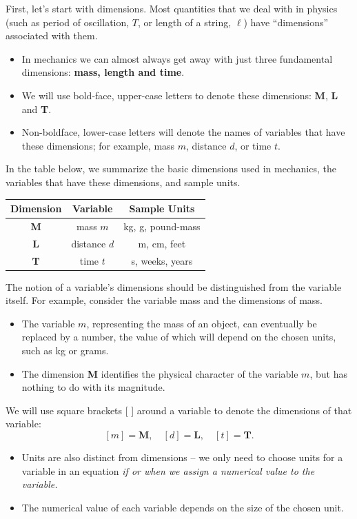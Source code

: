 \documentclass[11pt, letterpaper, openany]{book}
\begin{document}
First, let's start with dimensions. Most quantities that we deal with in physics (such as period of oscillation, $T$, or length of a string, $\ell$) have ``dimensions'' associated with them.
\begin{itemize}
    \item In mechanics we can almost always get away with just three fundamental dimensions: \textbf{mass, length and time}.
    \item We will use bold-face, upper-case letters to denote these dimensions: \textbf{M}, \textbf{L} and \textbf{T}.
    \item Non-boldface, lower-case letters will denote the names of variables that have these dimensions; for example, mass $m$, distance $d$, or time $t$.
\end{itemize}

In the table below, we summarize the basic dimensions used in mechanics, the variables that have these dimensions, and sample units.

\begin{center}
\begin{tabular}{ccc}
Dimension & Variable & Sample Units \\
\hline
\textbf{M} & mass $m$ & kg, g, pound-mass \\
\textbf{L} & distance $d$ & m, cm, feet \\
\textbf{T} & time $t$ & s, weeks, years \\
\hline
\end{tabular}
\end{center}

The notion of a variable's dimensions should be distinguished from the variable itself. For example, consider the variable mass and the dimensions of mass.
\begin{itemize}
    \item The variable $m$, representing the mass of an object, can eventually be replaced by a number, the value of which will depend on the chosen units, such as kg or grams.
    \item The dimension \textbf{M} identifies the physical character of the variable $m$, but has nothing to do with its magnitude.
\end{itemize}

We will use square brackets [ ] around a variable to denote the dimensions of that variable:
\[ [m] = \textbf{M}, \quad [d] = \textbf{L}, \quad [t] = \textbf{T}. \]

\begin{itemize}
    \item Units are also distinct from dimensions -- we only need to choose units for a variable in an equation \textit{if or when we assign a numerical value to the variable.}
    \item The numerical value of each variable depends on the size of the chosen unit.
\end{itemize}
\end{document}
